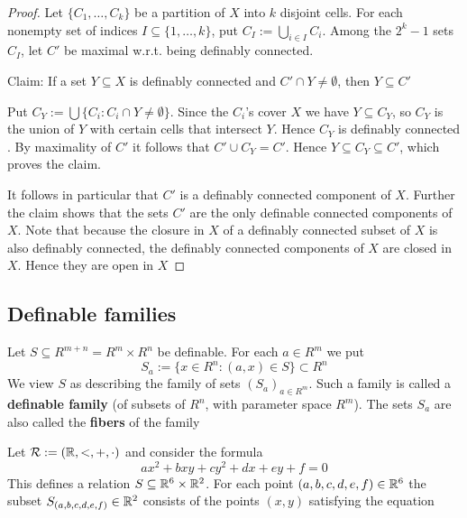 \documentclass[11pt]{article}
\begin{document}
\begin{proof}
Let \(\{C_1,\dots,C_k\}\) be a partition of \(X\) into \(k\) disjoint cells. For each nonempty set of
indices \(I\subseteq\{1,\dots,k\}\), put \(C_I:=\bigcup_{i\in I}C_i\). Among the \(2^k-1\) sets \(C_I\), let \(C'\) be
maximal w.r.t. being definably connected.

Claim: If a set \(Y\subseteq X\) is definably connected and \(C'\cap Y\neq\emptyset\), then \(Y\subseteq C'\)

Put \(C_Y:=\bigcup\{C_i:C_i\cap Y\neq\emptyset\}\). Since the \(C_i\)'s cover \(X\) we have \(Y\subseteq C_Y\), so \(C_Y\)
is the union of \(Y\) with certain cells that intersect \(Y\). Hence \(C_Y\) is definably
connected \label{Problem2}. By maximality of \(C'\) it follows that \(C'\cup C_Y=C'\).
Hence \(Y\subseteq C_Y\subseteq C'\), which proves the claim.

It follows in particular that \(C'\) is a definably connected component of \(X\). Further the
claim shows that the sets \(C'\) are the only definable connected components of \(X\). Note that
because the closure in \(X\) of a definably connected subset of \(X\) is also definably
connected, the definably connected components of \(X\) are closed in \(X\). Hence they are open
in \(X\)
\end{proof}

\subsection{Definable families}
\label{sec:orgcbec58f}
Let \(S\subseteq R^{m+n}=R^m\times R^n\) be definable. For each \(a\in R^m\) we put
\begin{equation*}
S_a:=\{x\in R^n:(a,x)\in S\}\subset R^n
\end{equation*}
We view \(S\) as describing the family of sets \((S_a)_{a\in R^m}\). Such a family is called a
\textbf{definable family} (of subsets of \(R^n\), with parameter space \(R^m\)). The sets \(S_a\) are also
called the \textbf{fibers} of the family

\begin{examplle}[]
Let \(\mathcal{R}:=(\mathbb{R},<,+,\cdot)\) and consider the formula
\begin{equation*}
ax^2+bxy+cy^2+dx+ey+f=0
\end{equation*}
This defines a relation \(S\subseteq\mathbb{R}^6\times\mathbb{R}^2\). For each point \((a,b,c,d,e,f)\in\mathbb{R}^6\) the
subset \(S_{(a,b,c,d,e,f)}\in\mathbb{R}^2\) consists of the points \((x,y)\) satisfying the equation
\end{examplle}
\end{document}
